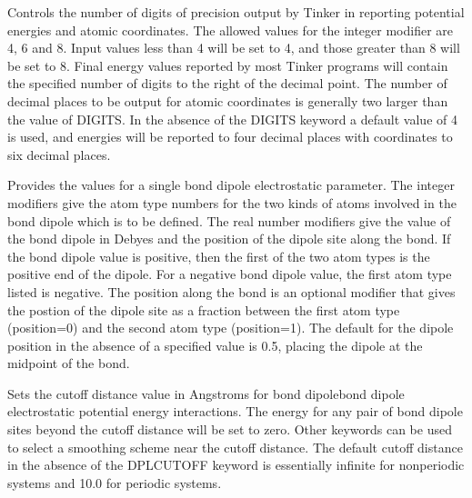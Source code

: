 \documentclass[letterpaper,11pt,english]{sphinxmanual}
\begin{document}
\ignorespaces {}\label{\detokenize{text/keywords:key-digits}}\begin{description}
\sphinxAtStartPar
Controls the number of digits of precision  output by Tinker in reporting potential energies and atomic coordinates. The allowed values for the integer modifier are 4, 6 and 8. Input values less than 4 will be set to 4, and those greater than 8 will be set to 8. Final energy values reported by most Tinker programs will contain the specified number of digits to the right of the decimal point. The number of decimal places to be output for atomic coordinates is generally two larger than the value of DIGITS. In the absence of the DIGITS keyword a default value of 4 is used, and  energies will be reported to four decimal places with coordinates to six decimal places.

\end{description}

\ignorespaces {}\label{\detokenize{text/keywords:key-dipole}}\begin{description}
\sphinxAtStartPar
Provides the values for a single bond dipole electrostatic parameter. The integer modifiers give the atom type numbers for the two kinds of atoms involved in the bond dipole which is to be defined. The real number modifiers give the value of the bond dipole in Debyes and the position of the dipole site along the bond. If the bond dipole value is positive, then the first of the two atom types is the positive end of the dipole. For a negative bond dipole value, the first atom type listed is negative. The position along the bond is an optional modifier that gives the postion of the dipole site as a fraction between the first atom type (position=0) and the second atom type (position=1). The default for the dipole position in the absence of a specified value is 0.5, placing the dipole at the midpoint of the bond.

\end{description}

\ignorespaces {}\label{\detokenize{text/keywords:key-dipole-cutoff}}\begin{description}
\sphinxAtStartPar
Sets the cutoff distance value in Angstroms for bond dipole\sphinxhyphen{}bond dipole electrostatic potential energy interactions. The energy for any pair of bond dipole sites beyond the cutoff distance will be set to zero. Other keywords can be used to select a smoothing scheme near the cutoff distance. The default cutoff distance in the absence of the DPL\sphinxhyphen{}CUTOFF keyword is essentially infinite for nonperiodic systems and 10.0 for periodic systems.

\end{description}
\end{document}

